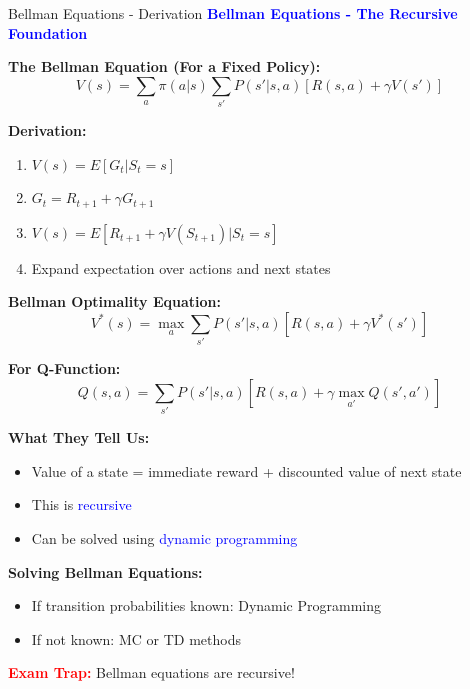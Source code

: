 \documentclass[8pt]{beamer}
\begin{document}
\begin{frame}{Bellman Equations - Derivation}
\fontsize{6.5}{7.5}\selectfont
\textcolor{blue}{\textbf{Bellman Equations - The Recursive Foundation}}

\textbf{The Bellman Equation (For a Fixed Policy):}
\[
V(s) = \sum_a \pi(a|s) \sum_{s'} P(s'|s,a) [R(s,a) + \gamma V(s')]
\]

\textbf{Derivation:}
\begin{enumerate}
\item $V(s) = E[G_t | S_t = s]$
\item $G_t = R_{t+1} + \gamma G_{t+1}$
\item $V(s) = E[R_{t+1} + \gamma V(S_{t+1}) | S_t = s]$
\item Expand expectation over actions and next states
\end{enumerate}

\textbf{Bellman Optimality Equation:}
\[
V^*(s) = \max_a \sum_{s'} P(s'|s,a) [R(s,a) + \gamma V^*(s')]
\]

\textbf{For Q-Function:}
\[
Q(s,a) = \sum_{s'} P(s'|s,a) [R(s,a) + \gamma \max_{a'} Q(s',a')]
\]

\textbf{What They Tell Us:}
\begin{itemize}
\item Value of a state = immediate reward + discounted value of next state
\item This is \textcolor{blue}{recursive}
\item Can be solved using \textcolor{blue}{dynamic programming}
\end{itemize}

\textbf{Solving Bellman Equations:}
\begin{itemize}
\item If transition probabilities known: Dynamic Programming
\item If not known: MC or TD methods
\end{itemize}

\textcolor{red}{\textbf{Exam Trap:}} Bellman equations are recursive!
\end{frame}
\end{document}
